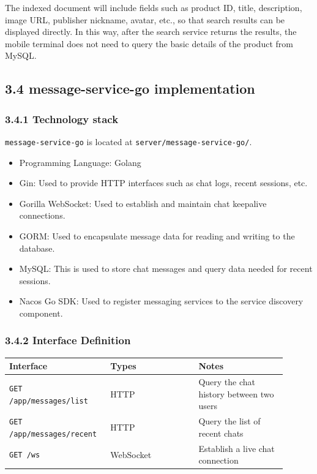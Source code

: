 \documentclass{article}
\begin{document}
The indexed document will include fields such as product ID, title, description, image URL, publisher nickname, avatar, etc., so that search results can be displayed directly. In this way, after the search service returns the results, the mobile terminal does not need to query the basic details of the product from MySQL.

\subsection{3.4 message-service-go implementation}

\subsubsection{3.4.1 Technology stack}

\texttt{message-service-go} is located at  \texttt{server/message-service-go/}.

\begin{itemize}
    \item Programming Language: Golang
    \item Gin: Used to provide HTTP interfaces such as chat logs, recent sessions, etc.
    \item Gorilla WebSocket: Used to establish and maintain chat keepalive connections.
    \item GORM: Used to encapsulate message data for reading and writing to the database.
    \item MySQL: This is used to store chat messages and query data needed for recent sessions.
    \item Nacos Go SDK: Used to register messaging services to the service discovery component.
\end{itemize}

\subsubsection{3.4.2 Interface Definition}

\begin{longtable}{p{0.30\linewidth}p{0.30\linewidth}p{0.30\linewidth}}
\toprule
\textbf{Interface} & \textbf{Types} & \textbf{Notes} \\
\midrule
\texttt{GET /app/messages/list} & HTTP & Query the chat history between two users \\
\texttt{GET /app/messages/recent} & HTTP & Query the list of recent chats \\
\texttt{GET /ws} & WebSocket & Establish a live chat connection \\
\bottomrule
\end{longtable}
\end{document}
